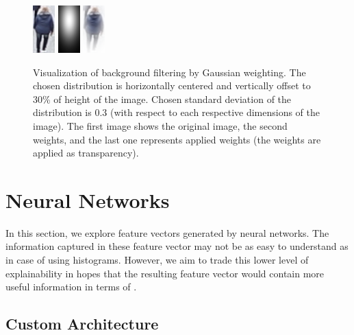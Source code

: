\begin{figure}
    \centering
    \includegraphics{img/background_filter/1_original.png} \hspace{1cm} \includegraphics{img/background_filter/weights.png} \hspace{1cm}
    \includegraphics{img/background_filter/weights_applied.png}
    \caption[Visualization of background filtering by Gaussian weighting]{Visualization of background filtering by Gaussian weighting. The chosen distribution is horizontally centered and vertically offset to 30\% of height of the image. Chosen standard deviation of the distribution is 0.3 (with respect to each respective dimensions of the image). The first image shows the original image, the second weights, and the last one represents applied weights (the weights are applied as transparency).}
    \label{fig:gaussian_weighting}
\end{figure}


\section{Neural Networks}



In this section, we explore feature vectors generated by neural networks. The information captured in these feature vector may not be as easy to understand as in case of using histograms. However, we aim to trade this lower level of explainability in hopes that the resulting feature vector would contain more useful information in terms of \reid{}.


\subsection{Custom Architecture}
\label{ssec:custom_architecture}

